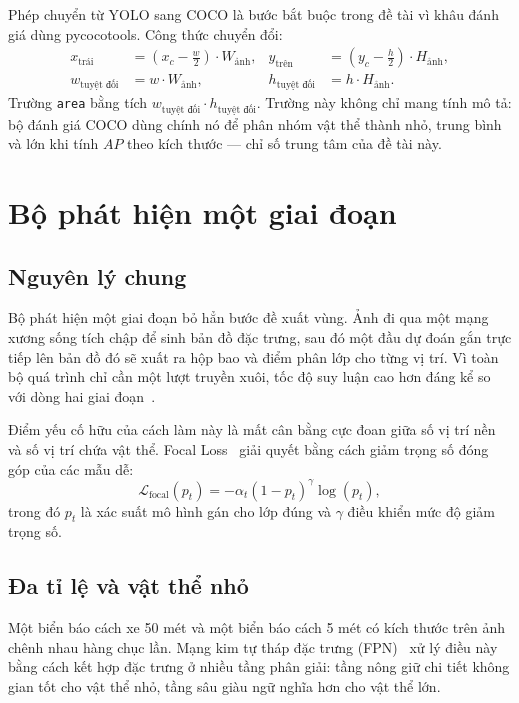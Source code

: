 Phép chuyển từ YOLO sang COCO là bước bắt buộc trong đề tài vì khâu đánh giá dùng pycocotools. Công
thức chuyển đổi:
\begin{align}
\label{eq:yolo2coco}
x_{\text{trái}} &= \left(x_c - \tfrac{w}{2}\right) \cdot W_{\text{ảnh}}, &
y_{\text{trên}} &= \left(y_c - \tfrac{h}{2}\right) \cdot H_{\text{ảnh}}, \\
w_{\text{tuyệt đối}} &= w \cdot W_{\text{ảnh}}, &
h_{\text{tuyệt đối}} &= h \cdot H_{\text{ảnh}}. \nonumber
\end{align}
Trường \texttt{area} bằng tích $w_{\text{tuyệt đối}} \cdot h_{\text{tuyệt đối}}$. Trường này không
chỉ mang tính mô tả: bộ đánh giá COCO dùng chính nó để phân nhóm vật thể thành nhỏ, trung bình và
lớn khi tính $AP$ theo kích thước --- chỉ số trung tâm của đề tài này.

\section{Bộ phát hiện một giai đoạn}

\subsection{Nguyên lý chung}

Bộ phát hiện một giai đoạn bỏ hẳn bước đề xuất vùng. Ảnh đi qua một mạng xương sống tích chập để
sinh bản đồ đặc trưng, sau đó một đầu dự đoán gắn trực tiếp lên bản đồ đó sẽ xuất ra hộp bao và
điểm phân lớp cho từng vị trí. Vì toàn bộ quá trình chỉ cần một lượt truyền xuôi, tốc độ suy luận
cao hơn đáng kể so với dòng hai giai đoạn~\cite{redmon2016yolo}.

Điểm yếu cố hữu của cách làm này là mất cân bằng cực đoan giữa số vị trí nền và số vị trí chứa vật
thể. Focal Loss~\cite{lin2017focal} giải quyết bằng cách giảm trọng số đóng góp của các mẫu dễ:
\begin{equation}
\label{eq:focal}
\mathcal{L}_{\text{focal}}(p_t) = -\alpha_t \left(1 - p_t\right)^{\gamma} \log(p_t),
\end{equation}
trong đó $p_t$ là xác suất mô hình gán cho lớp đúng và $\gamma$ điều khiển mức độ giảm trọng số.

\subsection{Đa tỉ lệ và vật thể nhỏ}
\label{sec:vat_the_nho}

Một biển báo cách xe 50 mét và một biển báo cách 5 mét có kích thước trên ảnh chênh nhau hàng chục
lần. Mạng kim tự tháp đặc trưng (FPN)~\cite{lin2017fpn} xử lý điều này bằng cách kết hợp đặc trưng
ở nhiều tầng phân giải: tầng nông giữ chi tiết không gian tốt cho vật thể nhỏ, tầng sâu giàu ngữ
nghĩa hơn cho vật thể lớn.

